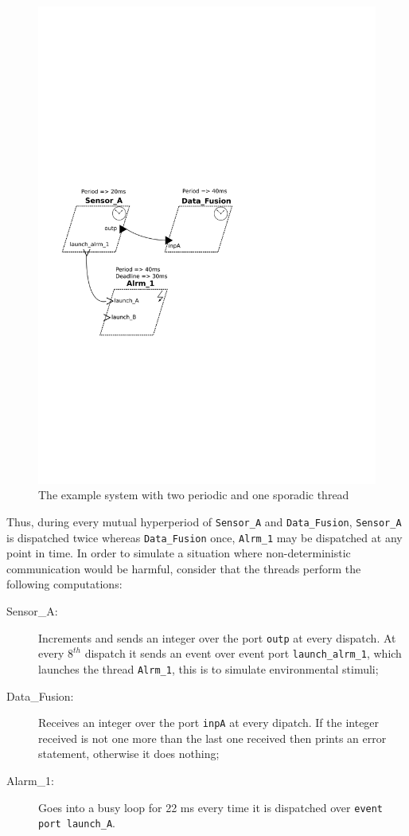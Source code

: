 \begin{figure}
\centering
\includegraphics[scale=0.6]{figs/control}
\caption{The example system with two periodic and one sporadic thread}
\label{fig:control_simple}
\end{figure}

Thus, during every mutual hyperperiod of \texttt{Sensor\_A} and
\texttt{Data\_Fusion}, \texttt{Sensor\_A} is dispatched twice whereas
\texttt{Data\_Fusion} once, \texttt{Alrm\_1} may be dispatched at any
point in time. In order to simulate a situation where
non-deterministic communication would be harmful, consider that the
threads perform the following computations:

\begin{description}
\item[Sensor\_A:]{Increments and sends an integer over the port
  \texttt{outp} at every dispatch. At every $8^{th}$ dispatch it sends
  an event over event port \texttt{launch\_alrm\_1}, which launches
  the thread \texttt{Alrm\_1}, this is to simulate environmental
  stimuli;}
\item[Data\_Fusion:]{Receives an integer over the port \texttt{inpA}
  at every dipatch. If the integer received is not one more than the
  last one received then prints an error statement, otherwise it does
  nothing;}
\item[Alarm\_1:]{Goes into a busy loop for 22 ms every time it is
  dispatched over \texttt{event port launch\_A}.}
\end{description}

